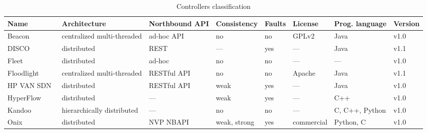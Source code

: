 

{\renewcommand{\arraystretch}{1.4}
\begin{table}[!htp]
\caption{Controllers classification}
\label{tab:controllers}
\begin{center}
\footnotesize
\begin{tabularx}{\linewidth}{p{2.94cm}Xp{2.29cm}p{1.47cm}p{0.75cm}p{1.35cm}p{2.1cm}p{0.9cm}}
\hline
\textbf{Name} & \textbf{Architecture} & \textbf{Northbound API} & \textbf{Consistency} & \textbf{Faults} & \textbf{License} & \textbf{Prog. language} & \textbf{Version}\\
\hline
Beacon~\cite{erickson2013}  & centralized multi-threaded  & ad-hoc API & no & no & GPLv2 & Java & v1.0 \\
\hline
DISCO~\cite{phemius2013} & distributed & REST & --- & yes & --- & Java & v1.1\\
\hline
 Fleet~\cite{Matsumoto2014_4} & distributed & ad-hoc & no & no & --- & --- & v1.0 \\
\hline
Floodlight~\cite{openflowhub.org2012} & centralized multi-threaded  & RESTful API & no & no & Apache & Java & v1.1 \\\hline
HP VAN SDN~\cite{hp2013-1} & distributed & RESTful API & weak & yes & --- & Java & v1.0 \\
\hline
HyperFlow~\cite{tootoonchian2010}  & distributed               & --- & weak & yes & --- & C++ & v1.0 \\
\hline
Kandoo~\cite{yeganeh2012}     & hierarchically distributed & --- & no & no & --- & C, C++, Python & v1.0 \\
\hline
Onix~\cite{koponen-1}       & distributed               & NVP NBAPI   & weak, strong & yes & commercial & Python, C & v1.0 \\

\end{tabularx}
\end{center}
\end{table}}
